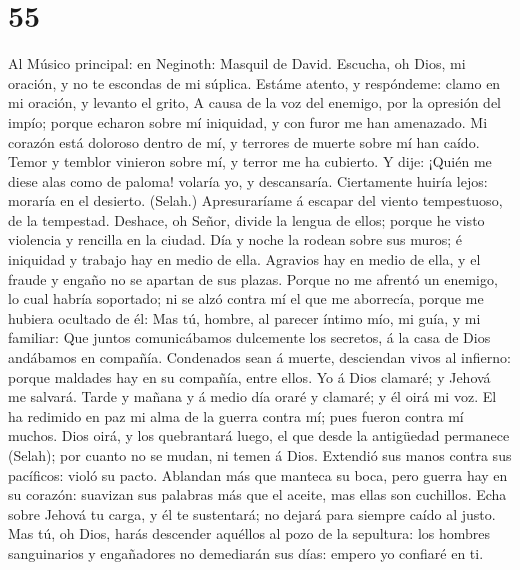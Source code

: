 \hypertarget{section-54}{%
\section{55}\label{section-54}}

 Al Músico principal: en Neginoth: Masquil de David.
Escucha, oh Dios, mi oración, y no te escondas de mi súplica.
 Estáme atento, y respóndeme: clamo en mi oración, y
levanto el grito,  A causa de la voz del enemigo, por la
opresión del impío; porque echaron sobre mí iniquidad, y con furor me
han amenazado.  Mi corazón está doloroso dentro de mí, y
terrores de muerte sobre mí han caído.  Temor y temblor
vinieron sobre mí, y terror me ha cubierto.  Y dije:
¡Quién me diese alas como de paloma! volaría yo, y descansaría.
 Ciertamente huiría lejos: moraría en el desierto.
(Selah.)  Apresuraríame á escapar del viento tempestuoso,
de la tempestad.  Deshace, oh Señor, divide la lengua de
ellos; porque he visto violencia y rencilla en la ciudad.
 Día y noche la rodean sobre sus muros; é iniquidad y
trabajo hay en medio de ella.  Agravios hay en medio de
ella, y el fraude y engaño no se apartan de sus plazas. 
Porque no me afrentó un enemigo, lo cual habría soportado; ni se alzó
contra mí el que me aborrecía, porque me hubiera ocultado de él:
 Mas tú, hombre, al parecer íntimo mío, mi guía, y mi
familiar:  Que juntos comunicábamos dulcemente los
secretos, á la casa de Dios andábamos en compañía. 
Condenados sean á muerte, desciendan vivos al infierno: porque maldades
hay en su compañía, entre ellos.  Yo á Dios clamaré; y
Jehová me salvará.  Tarde y mañana y á medio día oraré y
clamaré; y él oirá mi voz.  El ha redimido en paz mi alma
de la guerra contra mí; pues fueron contra mí muchos. 
Dios oirá, y los quebrantará luego, el que desde la antigüedad permanece
(Selah); por cuanto no se mudan, ni temen á Dios. 
Extendió sus manos contra sus pacíficos: violó su pacto. 
Ablandan más que manteca su boca, pero guerra hay en su corazón:
suavizan sus palabras más que el aceite, mas ellas son cuchillos.
 Echa sobre Jehová tu carga, y él te sustentará; no
dejará para siempre caído al justo.  Mas tú, oh Dios,
harás descender aquéllos al pozo de la sepultura: los hombres
sanguinarios y engañadores no demediarán sus días: empero yo confiaré en
ti.

